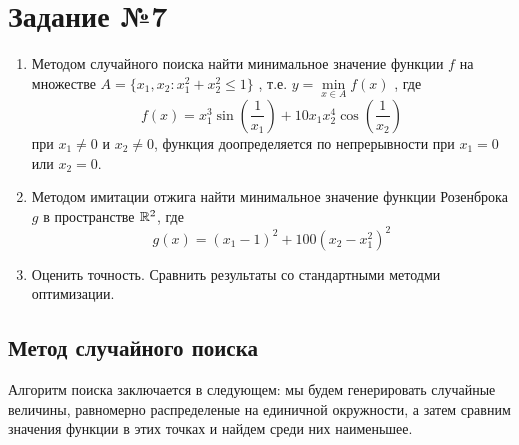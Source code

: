 \section{Задание №7}

\begin{enumerate}
        \item Методом случайного поиска найти минимальное значение функции
$
        f
$ 
        на множестве 
$
        A = \{x_1, x_2 : x_1^2 + x_2^2 \leq 1\}
$
        , т.е.
$
        y = \min\limits_{x \in A} f(x)
$
        , где 
$$
        f(x) = x_1^3\sin\left(\frac{1}{x_1}\right) +10x_1 x_2^4\cos\left(\frac{1}{x_2}\right)
$$
        при $x_1 \neq 0$ и $x_2 \neq 0$, функция доопределяется по непрерывности при $x_1 = 0$ или $x_2 = 0$.
        
        \item Методом имитации отжига найти минимальное значение функции Розенброка $g$ в пространстве $\mathbb{R}^2$, где 
$$
        g(x) = (x_1-1)^2+100(x_2-x_1^2)^2
$$

        \item Оценить точность. Сравнить результаты со стандартными методми оптимизации.
\end{enumerate}


\subsection{Метод случайного поиска}

Алгоритм поиска заключается в следующем: мы будем генерировать случайные величины, равномерно распределеные на единичной окружности, а затем сравним значения функции в этих точках и найдем среди них наименьшее.


